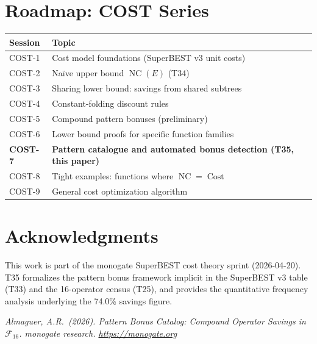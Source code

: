 \documentclass[12pt,a4paper]{article}
\theoremstyle{definition}
\newcommand{\NC}{\operatorname{NC}}
\newcommand{\Cost}{\operatorname{Cost}}
\begin{document}
\section*{Roadmap: COST Series}

\begin{center}
\begin{tabular}{@{}ll@{}}
\toprule
\textbf{Session} & \textbf{Topic} \\
\midrule
COST-1 & Cost model foundations (SuperBEST v3 unit costs) \\
COST-2 & Na\"{i}ve upper bound $\NC(E)$ (T34) \\
COST-3 & Sharing lower bound: savings from shared subtrees \\
COST-4 & Constant-folding discount rules \\
COST-5 & Compound pattern bonuses (preliminary) \\
COST-6 & Lower bound proofs for specific function families \\
\textbf{COST-7} & \textbf{Pattern catalogue and automated bonus detection (T35, this paper)} \\
COST-8 & Tight examples: functions where $\NC = \Cost$ \\
COST-9 & General cost optimization algorithm \\
\bottomrule
\end{tabular}
\end{center}

\section*{Acknowledgments}

This work is part of the monogate SuperBEST cost theory sprint (2026-04-20).
T35 formalizes the pattern bonus framework implicit in the SuperBEST v3
table (T33) and the 16-operator census (T25), and provides the quantitative
frequency analysis underlying the 74.0\% savings figure.

\bigskip
\noindent\textit{Almaguer, A.R.\ (2026).
Pattern Bonus Catalog: Compound Operator Savings in $\mathcal{F}_{16}$.
monogate research. \url{https://monogate.org}}
\end{document}
